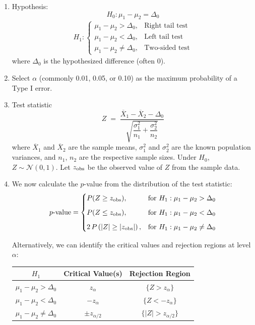 \documentclass[twoside]{book}
\begin{document}
\begin{enumerate}
	\item Hypothesis:
	$$H_0: \mu_1 - \mu_2 = \Delta_0$$
	\begin{align*}
	H_1: \begin{cases}
	\mu_1 - \mu_2 > \Delta_0, & \text{Right tail test}\\[6pt]
	\mu_1 - \mu_2 < \Delta_0, & \text{Left tail test}\\[6pt]
	\mu_1 - \mu_2 \neq \Delta_0, & \text{Two-sided test}
	\end{cases}
	\end{align*}
	where \(\Delta_0\) is the hypothesized difference (often 0).

	\item Select \(\alpha\) (commonly 0.01, 0.05, or 0.10) as the maximum probability of a Type I error.

	\item Test statistic
	\[
	Z \;=\; \frac{\overline{X}_1 - \overline{X}_2 - \Delta_0}{\sqrt{\dfrac{\sigma_1^2}{n_1} + \dfrac{\sigma_2^2}{n_2}}}
	\]
	where \(\overline{X}_1\) and \(\overline{X}_2\) are the sample means, \(\sigma_1^2\) and \(\sigma_2^2\) are the known population variances, and \(n_1\), \(n_2\) are the respective sample sizes. Under \(H_0\), \(Z \sim \mathcal{N}(0,1)\). Let \(z_{\rm obs}\) be the observed value of \(Z\) from the sample data.

	\item We now calculate the \(p\)-value from the distribution of the test statistic:
	\[
	p\text{-value} =
	\begin{cases}
	P(Z \ge z_{\rm obs}), & \text{for } H_1: \mu_1 - \mu_2 > \Delta_0 \\[6pt]
	P(Z \le z_{\rm obs}), & \text{for } H_1: \mu_1 - \mu_2 < \Delta_0 \\[6pt]
	2\,P\left(|Z| \ge |z_{\rm obs}|\right), & \text{for } H_1: \mu_1 - \mu_2 \neq \Delta_0
	\end{cases}
	\]

	Alternatively, we can identify the critical values and rejection regions at level \(\alpha\):
	\begin{table}[H]
		\centering
		\begin{tabular}{@{}c|c|c@{}}
			\toprule
			\textbf{$H_1$} & \textbf{Critical Value(s)} & \textbf{Rejection Region} \\
			\midrule
			$\mu_1 - \mu_2 > \Delta_0$ & $z_{\alpha}$ &
			\(\{Z > z_{\alpha}\}\) \\[6pt]
			$\mu_1 - \mu_2 < \Delta_0$ & $-z_{\alpha}$ &
			\(\{Z < -z_{\alpha}\}\) \\[6pt]
			$\mu_1 - \mu_2 \neq \Delta_0$ & $\pm z_{\alpha/2}$ &
			\(\{|Z| > z_{\alpha/2}\}\) \\
			\bottomrule
		\end{tabular}
	\end{table}


\end{enumerate}
\end{document}
